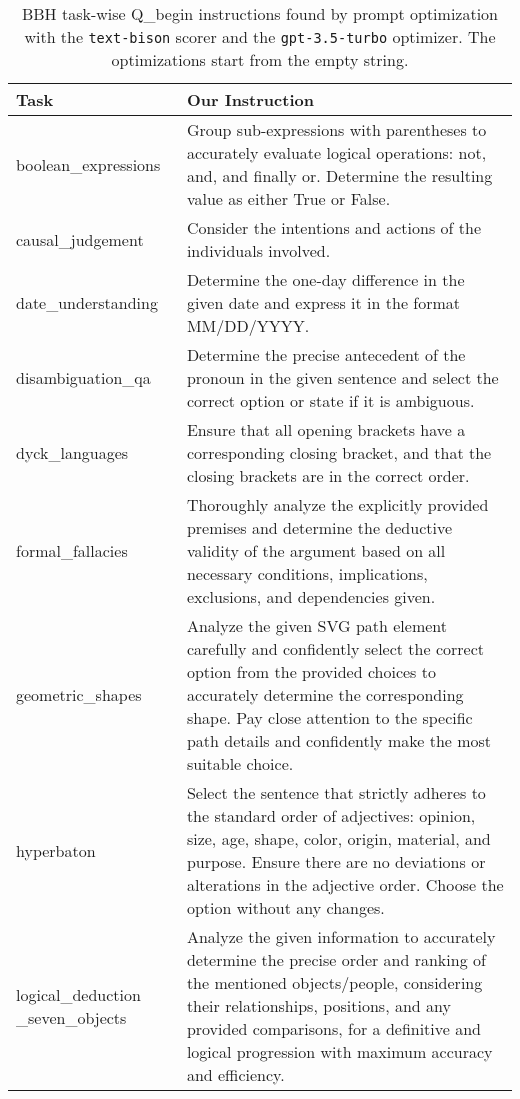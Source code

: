 \newpage
\begin{table}[H]
\scriptsize
\caption{BBH task-wise Q\_begin instructions found by prompt optimization with the \texttt{text-bison} scorer and the \texttt{gpt-3.5-turbo} optimizer.
The optimizations start from the empty string.
}
\begin{center}
\begin{tabular}{P{2.3cm}P{11.6cm}}
\toprule
Task & Our Instruction \\
\midrule
boolean\_expressions & Group sub-expressions with parentheses to accurately evaluate logical operations: not, and, and finally or. Determine the resulting value as either True or False. \\ [2ex]
causal\_judgement & Consider the intentions and actions of the individuals involved. \\ [2ex]
date\_understanding & Determine the one-day difference in the given date and express it in the format MM/DD/YYYY. \\ [2ex]
disambiguation\_qa & Determine the precise antecedent of the pronoun in the given sentence and select the correct option or state if it is ambiguous. \\ [2ex]
dyck\_languages & Ensure that all opening brackets have a corresponding closing bracket, and that the closing brackets are in the correct order. \\ [2ex]
formal\_fallacies & Thoroughly analyze the explicitly provided premises and determine the deductive validity of the argument based on all necessary conditions, implications, exclusions, and dependencies given. \\ [2ex]
geometric\_shapes & Analyze the given SVG path element carefully and confidently select the correct option from the provided choices to accurately determine the corresponding shape. Pay close attention to the specific path details and confidently make the most suitable choice. \\ [2ex]
hyperbaton & Select the sentence that strictly adheres to the standard order of adjectives: opinion, size, age, shape, color, origin, material, and purpose. Ensure there are no deviations or alterations in the adjective order. Choose the option without any changes. \\ [2ex]
logical\_deduction \_seven\_objects & Analyze the given information to accurately determine the precise order and ranking of the mentioned objects/people, considering their relationships, positions, and any provided comparisons, for a definitive and logical progression with maximum accuracy and efficiency. \\ [2ex]

\end{tabular}
\end{center}
\end{table}
